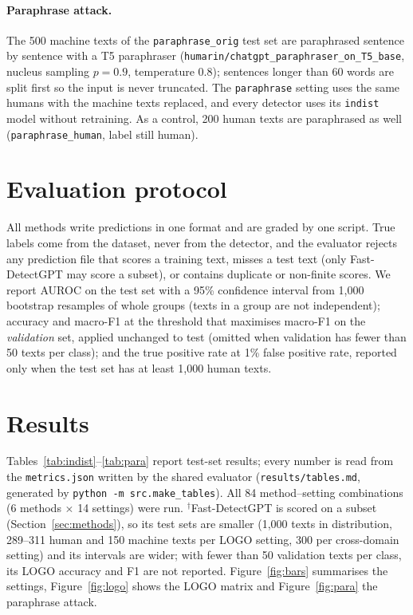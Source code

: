 \documentclass{nle}
\begin{document}
\paragraph{Paraphrase attack.} The 500 machine texts of the \texttt{paraphrase\_orig} test set are paraphrased sentence
by sentence with a T5 paraphraser (\texttt{humarin/chatgpt\_paraphraser\_on\_T5\_base}, nucleus sampling $p=0.9$,
temperature 0.8); sentences longer than 60 words are split first so the input is never truncated. The
\texttt{paraphrase} setting uses the same humans with the machine texts replaced, and every detector uses its
\texttt{indist} model without retraining. As a control, 200 human texts are paraphrased as well
(\texttt{paraphrase\_human}, label still human).

\section{Evaluation protocol}

All methods write predictions in one format and are graded by one script. True labels come from the dataset, never
from the detector, and the evaluator rejects any prediction file that scores a training text, misses a test text (only
Fast-DetectGPT may score a subset), or contains duplicate or non-finite scores. We report AUROC on the test set with a
95\% confidence interval from 1,000 bootstrap resamples of whole groups (texts in a group are not independent);
accuracy and macro-F1 at the threshold that maximises macro-F1 on the \emph{validation} set, applied unchanged to
test (omitted when validation has fewer than 50 texts per class); and the true positive rate at 1\% false positive
rate, reported only when the test set has at least 1,000 human texts.

\section{Results}

Tables~\ref{tab:indist}--\ref{tab:para} report test-set results; every number is read from the
\texttt{metrics.json} written by the shared evaluator (\texttt{results/tables.md}, generated by
\texttt{python -m src.make\_tables}). All 84 method--setting combinations (6 methods $\times$ 14 settings) were run. $^\dagger$Fast-DetectGPT is
scored on a subset (Section~\ref{sec:methods}), so its test sets are smaller (1,000 texts in distribution, 289--311 human and 150
machine texts per LOGO setting, 300 per cross-domain setting) and its intervals are wider; with fewer than 50
validation texts per class, its LOGO accuracy and F1 are not reported. Figure~\ref{fig:bars} summarises the
settings, Figure~\ref{fig:logo} shows the LOGO matrix and Figure~\ref{fig:para} the paraphrase attack.
\end{document}
